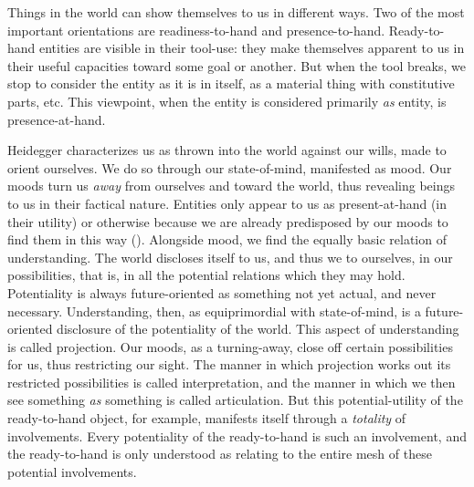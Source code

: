 \documentclass[leqno, 12pt]{turabian-researchpaper}
\begin{document}

	Things in the world can show themselves to us in different ways. Two of the
	most important orientations are readiness-to-hand and presence-to-hand. Ready-to-hand
	entities are visible in their tool-use: they make themselves apparent to us in
	their useful capacities toward some goal or another. But when the tool breaks,
	we stop to consider the entity as it is in itself, as a material thing with constitutive
	parts, etc. This viewpoint, when the entity is considered primarily \emph{as} entity,
	is presence-at-hand.

	Heidegger characterizes us as thrown into the world against our wills, made to
	orient ourselves. We do so through our state-of-mind, manifested as mood. Our
	moods turn us \emph{away} from ourselves and toward the world, thus revealing
	beings to us in their factical nature. Entities only appear to us as present-at-hand
	(in their utility) or otherwise because we are already predisposed by our moods
	to find them in this way (). Alongside
	mood, we find the equally basic relation of understanding. The world discloses
	itself to us, and thus we to ourselves, in our possibilities, that is, in all
	the potential relations which they may hold. Potentiality is always future-oriented
	as something not yet actual, and never necessary. Understanding, then, as equiprimordial
	with state-of-mind, is a future-oriented disclosure of the potentiality of the
	world. This aspect of understanding is called projection. Our moods, as a turning-away,
	close off certain possibilities for us, thus restricting our sight. The manner
	in which projection works out its restricted possibilities is called
	interpretation, and the manner in which we then see something \emph{as}
	something is called articulation. But this potential-utility of the ready-to-hand
	object, for example, manifests itself through a \emph{totality} of
	involvements. Every potentiality of the ready-to-hand is such an involvement,
	and the ready-to-hand is only understood as relating to the entire mesh of
	these potential involvements.
\end{document}
